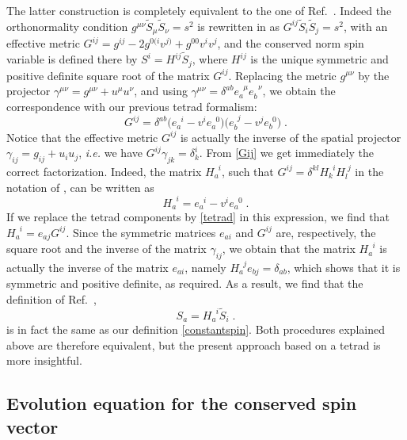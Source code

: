 \documentclass[
superscriptaddress,
preprint,
prd,tightenlines,showpacs,nofootinbib,
eqsecnum,
amsfonts,amsmath,amssymb]{revtex4-1}
\begin{document}
The latter construction is completely equivalent to the one of
Ref.~\cite{Damour2008a}. Indeed the orthonormality condition
$g^{\mu\nu}\tilde{S}_{\mu}\tilde{S}_{\nu} = s^{2}$ is rewritten in
\cite{Damour2008a} as $G^{ij}\tilde{S}_{i}\tilde{S}_{j} = s^{2}$, with
an effective metric $G^{ij} = g^{ij} - 2 g^{0(i}v^{j)} + g^{00}
v^{i}v^{j}$, and the conserved norm spin variable is defined there by
$S^{i}=H^{ij}\tilde{S}_{j}$, where $H^{ij}$ is the unique symmetric
and positive definite square root of the matrix $G^{ij}$. Replacing
the metric $g^{\mu\nu}$ by the projector
$\gamma^{\mu\nu}=g^{\mu\nu}+u^\mu u^\nu$, and using
$\gamma^{\mu\nu}=\delta^{ab}e_a^{\phantom{a}\mu}e_b^{\phantom{\beta}\nu}$,
we obtain the correspondence with our previous tetrad formalism:
%
\begin{equation}\label{Gij}
  G^{ij} = \delta^{ab}\bigl(e_a^{\phantom{a}i} 
  - v^i e_a^{\phantom{a}0}\bigr)\bigl(e_b^{\phantom{b}j} - v^j e_b^{\phantom{b}0}\bigr)\;.
\end{equation}
%
Notice that the effective metric $G^{ij}$ is actually the inverse of
the spatial projector $\gamma_{ij}=g_{ij}+u_i u_j$, \textit{i.e.} we have
$G^{ij}\gamma_{jk}=\delta^i_k$. From \eqref{Gij} we get immediately
the correct factorization. Indeed, the matrix
$H_a^{\phantom{a}i}$, such that $G^{ij} =
\delta^{kl}H_k^{\phantom{k}i}H_l^{\phantom{l}j}$ in the notation of
\cite{Damour2008a}, can be written as
%
\begin{equation}\label{Hij}
	H_a^{\phantom{a}i}=e_a^{\phantom{a}i} - v^i e_a^{\phantom{a}0}\;.
\end{equation}
% 
If we replace the tetrad components by \eqref{tetrad} in this
expression, we find that $H_a^{\phantom{a}i} = e_{aj}G^{ij}$. Since
the symmetric matrices $e_{ai}$ and $G^{ij}$ are, respectively, the square root
and the inverse of the matrix $\gamma_{ij}$, we obtain that the matrix
$H_a^{\phantom{a}i}$ is actually the inverse of the matrix $e_{ai}$,
namely $H_a^{\phantom{a}j}e_{bj} = \delta_{ab}$, which shows that it
is symmetric and positive definite, as required. As a result, we find that
the definition of Ref.~\cite{Damour2008a},
%
\begin{equation}\label{eq:DefSi}
  S_a = H_a^{\phantom{a}i} \tilde{S}_i\;.
\end{equation}
% 
is in fact the same as our definition \eqref{constantspin}. Both
procedures explained above are therefore equivalent, but the present
approach based on a tetrad is more insightful.

\subsection{Evolution equation for the conserved spin vector}
\label{subsec:precessiongeneralframe}
\end{document}
